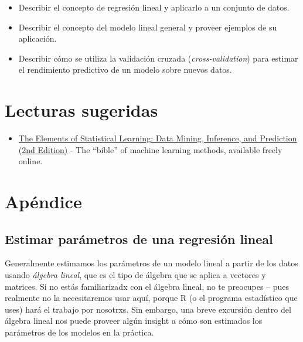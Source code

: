 \documentclass[
  12pt,
]{book}
\providecommand{\tightlist}{%
  \setlength{\itemsep}{0pt}\setlength{\parskip}{0pt}}
\begin{document}
\begin{itemize}
\tightlist
\item
  Describir el concepto de regresión lineal y aplicarlo a un conjunto de datos.
\item
  Describir el concepto del modelo lineal general y proveer ejemplos de su aplicación.
\item
  Describir cómo se utiliza la validación cruzada (\emph{cross-validation}) para estimar el rendimiento predictivo de un modelo sobre nuevos datos.
\end{itemize}

\hypertarget{lecturas-sugeridas-10}{%
\section{Lecturas sugeridas}\label{lecturas-sugeridas-10}}

\begin{itemize}
\tightlist
\item
  \href{https://web.stanford.edu/~hastie/Papers/ESLII.pdf}{The Elements of Statistical Learning: Data Mining, Inference, and Prediction (2nd Edition)} - The ``bible'' of machine learning methods, available freely online.
\end{itemize}

\hypertarget{apuxe9ndice-5}{%
\section{Apéndice}\label{apuxe9ndice-5}}

\hypertarget{estimar-paruxe1metros-de-una-regresiuxf3n-lineal}{%
\subsection{Estimar parámetros de una regresión lineal}\label{estimar-paruxe1metros-de-una-regresiuxf3n-lineal}}

Generalmente estimamos los parámetros de un modelo lineal a partir de los datos usando \emph{álgebra lineal}, que es el tipo de álgebra que se aplica a vectores y matrices. Si no estás familiarizadx con el álgebra lineal, no te preocupes -- pues realmente no la necesitaremos usar aquí, porque R (o el programa estadístico que uses) hará el trabajo por nosotrxs. Sin embargo, una breve excursión dentro del álgebra lineal nos puede proveer algún insight a cómo son estimados los parámetros de los modelos en la práctica.
\end{document}
